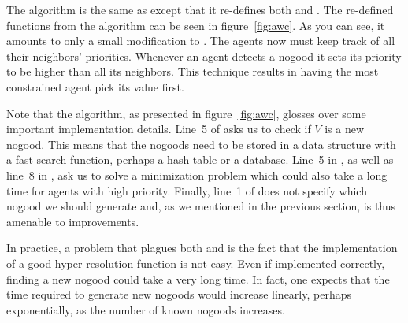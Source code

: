  The  algorithm is the same as 
except that it re-defines both  and
. The re-defined functions from the 
algorithm can be seen in figure~\ref{fig:awc}. As you can see, it
amounts to only a small modification to . The agents now
must keep track of all their neighbors' priorities. Whenever an agent
detects a nogood it sets its priority to be higher than all its
neighbors. This technique results in having the most constrained agent
pick its value first.

Note that the algorithm, as presented in figure~\ref{fig:awc}, glosses
over some important implementation details. Line~5 of
 asks us to check if $V$ is a new nogood. This means
that the nogoods need to be stored in a data structure with a fast
search function, perhaps a hash table or a database. Line~5 in
, as well as line~8 in , ask
us to solve a minimization problem which could also take a long time
for agents with high priority. Finally, line~1 of 
does not specify which nogood we should generate and, as we
mentioned in the previous section, is thus amenable to improvements.

In practice, a problem that plagues both  and  is
the fact that the implementation of a good hyper-resolution function
is not easy. Even if implemented correctly, finding a new nogood could
take a very long time. In fact, one expects that the time required to
generate new nogoods would increase linearly, perhaps exponentially,
as the number of known nogoods increases.




